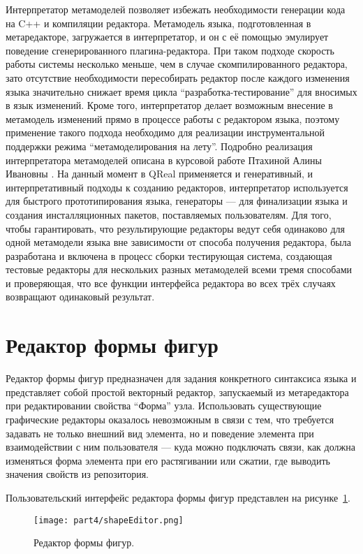 Интерпретатор метамоделей позволяет избежать необходимости генерации кода на C++ и 
компиляции редактора. Метамодель языка, подготовленная в метаредакторе, загружается 
в интерпретатор, и он с её помощью эмулирует поведение сгенерированного плагина-редактора. 
При таком подходе скорость работы системы несколько меньше, чем в случае скомпилированного 
редактора, зато отсутствие необходимости пересобирать редактор после каждого изменения 
языка значительно снижает время цикла "`разработка-тестирование"' для вносимых в язык 
изменений. Кроме того, интерпретатор делает возможным внесение в метамодель изменений 
прямо в процессе работы с редактором языка, поэтому применение такого подхода необходимо 
для реализации инструментальной поддержки режима "`метамоделирования на лету"'. Подробно 
реализация интерпретатора метамоделей описана в курсовой работе Птахиной Алины Ивановны
. На данный момент в QReal применяется и генеративный, и интерпретативный подходы к 
созданию редакторов, интерпретатор используется для быстрого прототипирования языка, 
генераторы --- для финализации языка и создания инсталляционных пакетов, поставляемых 
пользователям. Для того, чтобы гарантировать, что результирующие редакторы ведут себя 
одинаково для одной метамодели языка вне зависимости от способа получения редактора, 
была разработана и включена в процесс сборки тестирующая система, создающая тестовые 
редакторы для нескольких разных метамоделей всеми тремя способами и проверяющая, что 
все функции интерфейса редактора во всех трёх случаях возвращают одинаковый результат.

\section{Редактор формы фигур}
Редактор формы фигур предназначен для задания конкретного синтаксиса языка и представляет 
собой простой векторный редактор, запускаемый из метаредактора при редактировании свойства 
"`Форма"' узла. Использовать существующие графические редакторы оказалось невозможным 
в связи с тем, что требуется задавать не только внешний вид элемента, но и поведение 
элемента при взаимодействии с ним пользователя --- куда можно подключать связи, как 
должна изменяться форма элемента при его растягивании или сжатии, где выводить значения 
свойств из репозитория.

Пользовательский интерфейс редактора формы фигур представлен на рисунке~\ref{image:shapeEditor}.

\begin{figure} [ht]
	\begin{center}
		\texttt{[image: part4/shapeEditor.png]}
		\caption{Редактор формы фигур.}
		\label{image:shapeEditor}
	\end{center}
\end{figure}

